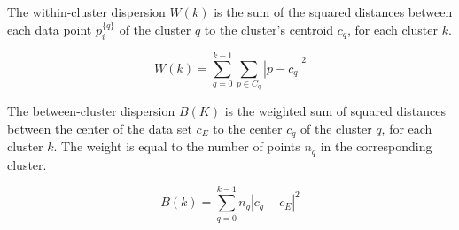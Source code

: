 The within-cluster dispersion $W(k)$ is the sum of the squared distances between each data point $p_{i}^{\{q\}}$ of the cluster $q$ to the cluster's centroid $c_{q}$, for each cluster $k$.

$$ W(k) = \sum_{q=0}^{k-1} \sum_{p \in C_{q}} |p - c_{q}|^{2} $$


The between-cluster dispersion $B(K)$ is the weighted sum of squared distances between the center of the data set $c_{E}$ to the center $c_{q}$ of the cluster $q$, for each cluster $k$. The weight is equal to the number of points $n_{q}$ in the corresponding cluster.


$$ B(k) = \sum_{q = 0}^{k - 1} n_{q} |c_{q} - c_{E}|^{2} $$





